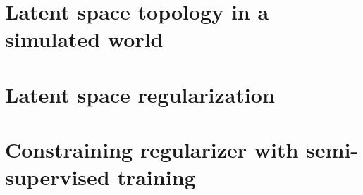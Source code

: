 %


\section{Latent space topology in a simulated world}



\section{Latent space regularization}

\section{Constraining regularizer with semi-supervised training}

